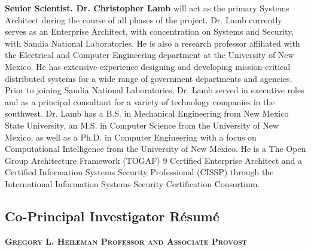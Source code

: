 \documentclass{sbir}
\begin{document}
{{\bf Senior Scientist. Dr. Christopher Lamb} will act as the primary Systems Architect during the course of all phases of the project. Dr. Lamb currently serves as an Enterprise Architect, with concentration on Systems and Security, with Sandia National Laboratories. He is also a research professor affiliated with the Electrical and Computer Engineering department at the University of New Mexico. He has extensive experience designing and developing mission-critical distributed systems for a wide range of government departments and agencies. Prior to joining Sandia National Laboratories, Dr. Lamb served in executive roles and as a principal consultant for a variety of technology companies in the southwest. Dr. Lamb has a B.S. in Mechanical Engineering from New Mexico State University, an M.S. in Computer Science from the University of New Mexico, as well as a Ph.D. in Computer Engineering with a focus on Computational Intelligence from the University of New Mexico. He is a The Open Group Architecture Framework (TOGAF) 9 Certified Enterprise Architect and a Certified Information Systems Security Professional (CISSP) through the International Information Systems Security Certification Consortium.

\subsection{Co-Principal Investigator R\'esum\'e}\label{GLH}

\textbf{\textsc{Gregory L. Heileman \hfill Professor and Associate Provost}}

}
\end{document}
